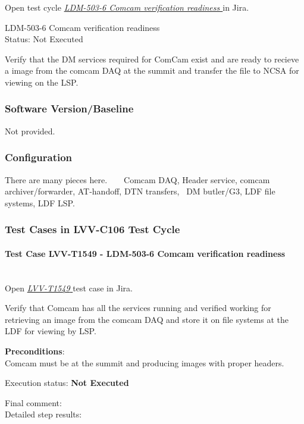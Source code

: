 \documentclass[DM,lsstdraft,STR,toc]{lsstdoc}
\begin{document}
Open test cycle {\it \href{https://jira.lsstcorp.org/secure/Tests.jspa#/testrun/LVV-C106}{LDM-503-6 Comcam verification readiness
}} in Jira.

  LDM-503-6 Comcam verification readiness
\\
  Status: Not Executed

  Verify that the DM services required for ComCam exist and are ready to
recieve a image from the comcam DAQ at the summit and transfer the file
to NCSA for viewing on the LSP.~ ~


  \subsubsection{Software Version/Baseline}
    Not provided.

  \subsubsection{Configuration}
    There are many pieces here. ~ ~ Comcam DAQ, Header service, comcam
archiver/forwarder, AT-handoff, DTN transfers, ~DM butler/G3, LDF file
systems, LDF LSP.~


  \subsubsection{Test Cases in LVV-C106 Test Cycle}


    \paragraph{Test Case LVV-T1549 - LDM-503-6 Comcam verification readiness
 }\mbox{}\\

Open  \href{https://jira.lsstcorp.org/secure/Tests.jspa#/testCase/LVV-T1549}{\textit{ LVV-T1549 } }
test case in Jira.

    Verify that Comcam has all the services running and verified working for
retrieving an image from the comcam DAQ and store it on file systems at
the LDF for viewing by LSP. ~


    \textbf{ Preconditions}:\\
    Comcam must be at the summit and producing images with proper headers. ~


    Execution status: {\bf Not Executed }

    Final comment:\\


    Detailed step results:
\end{document}
